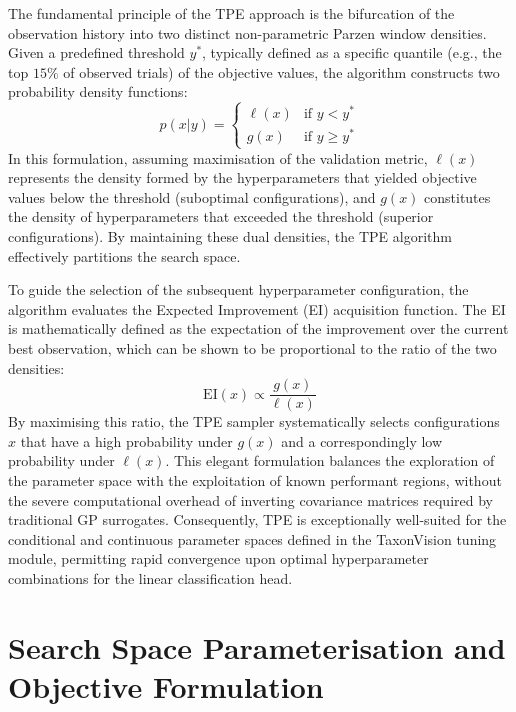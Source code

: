 The fundamental principle of the TPE approach is the bifurcation of the observation history into two distinct non-parametric Parzen window densities. Given a predefined threshold $y^*$, typically defined as a specific quantile (e.g., the top $15\%$ of observed trials) of the objective values, the algorithm constructs two probability density functions:
\begin{equation}
    p(x|y) =
    \begin{cases}
    \ell(x) & \text{if } y < y^* \\
    g(x) & \text{if } y \geq y^*
    \end{cases}
\end{equation}
In this formulation, assuming maximisation of the validation metric, $\ell(x)$ represents the density formed by the hyperparameters that yielded objective values below the threshold (suboptimal configurations), and $g(x)$ constitutes the density of hyperparameters that exceeded the threshold (superior configurations). By maintaining these dual densities, the TPE algorithm effectively partitions the search space.

To guide the selection of the subsequent hyperparameter configuration, the algorithm evaluates the Expected Improvement (EI) acquisition function. The EI is mathematically defined as the expectation of the improvement over the current best observation, which can be shown to be proportional to the ratio of the two densities:
\begin{equation}
    \text{EI}(x) \propto \frac{g(x)}{\ell(x)}
\end{equation}
By maximising this ratio, the TPE sampler systematically selects configurations $x$ that have a high probability under $g(x)$ and a correspondingly low probability under $\ell(x)$. This elegant formulation balances the exploration of the parameter space with the exploitation of known performant regions, without the severe computational overhead of inverting covariance matrices required by traditional GP surrogates. Consequently, TPE is exceptionally well-suited for the conditional and continuous parameter spaces defined in the TaxonVision tuning module, permitting rapid convergence upon optimal hyperparameter combinations for the linear classification head.



\section{Search Space Parameterisation and Objective Formulation}
\label{sec:search_space_parameterisation}

